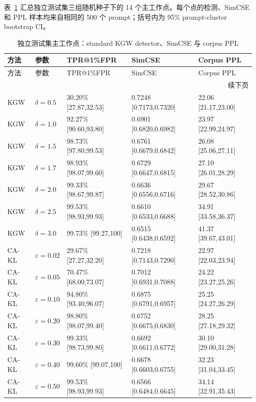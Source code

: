 \documentclass[a4paper,UTF8,zihao=5]{ctexart}
\makeatletter
\newcommand{\cakl}{CA-KL}
\newcommand{\tpr}{TPR@1\%FPR}
\makeatother
\begin{document}
表~\ref{tab:main-test} 汇总独立测试集三组随机种子下的 14 个主工作点。每个点的检测、SimCSE 和 PPL 样本均来自相同的 500 个 prompt；括号内为 95\% prompt-cluster bootstrap CI。

\begin{longtable}{p{}p{}p{}p{}p{}}
    \caption{独立测试集主工作点：standard KGW detector、SimCSE 与 corpus PPL}\label{tab:main-test}                  \\
    \toprule
    方法      & 参数                 & \tpr{}                & SimCSE                 & Corpus PPL          \\
    \midrule
    \endfirsthead
    \toprule
    方法      & 参数                 & \tpr{}                & SimCSE                 & Corpus PPL          \\
    \midrule
    \endhead
    \midrule
    \multicolumn{5}{r}{续下页}                                                                             \\
    \endfoot
    \bottomrule
    \endlastfoot
    KGW     & $\delta=0.5$       & 30.20\% [27.87,32.53] & 0.7248 [0.7173,0.7320] & 22.06 [21.17,23.00] \\
    KGW     & $\delta=1.0$       & 92.27\% [90.60,93.80] & 0.6901 [0.6820,0.6982] & 23.97 [22.99,24.97] \\
    KGW     & $\delta=1.5$       & 98.73\% [97.80,99.53] & 0.6761 [0.6679,0.6842] & 26.08 [25.06,27.11] \\
    KGW     & $\delta=1.7$       & 98.93\% [98.07,99.60] & 0.6729 [0.6647,0.6815] & 27.10 [26.01,28.29] \\
    KGW     & $\delta=2.0$       & 99.33\% [98.67,99.87] & 0.6636 [0.6556,0.6716] & 29.67 [28.52,30.86] \\
    KGW     & $\delta=2.5$       & 99.53\% [98.93,99.93] & 0.6610 [0.6533,0.6688] & 34.91 [33.58,36.37] \\
    KGW     & $\delta=3.0$       & 99.73\% [99.27,100]   & 0.6515 [0.6438,0.6592] & 41.37 [39.67,43.01] \\
    \midrule
    \cakl{} & $\varepsilon=0.02$ & 29.67\% [27.27,32.20] & 0.7218 [0.7143,0.7290] & 22.97 [22.03,23.94] \\
    \cakl{} & $\varepsilon=0.05$ & 70.47\% [68.00,73.07] & 0.7012 [0.6931,0.7088] & 24.22 [23.27,25.26] \\
    \cakl{} & $\varepsilon=0.10$ & 94.80\% [93.40,96.07] & 0.6875 [0.6791,0.6957] & 25.25 [24.27,26.29] \\
    \cakl{} & $\varepsilon=0.20$ & 98.80\% [98.07,99.40] & 0.6752 [0.6675,0.6830] & 28.25 [27.18,29.32] \\
    \cakl{} & $\varepsilon=0.30$ & 99.33\% [98.73,99.80] & 0.6692 [0.6611,0.6772] & 30.10 [29.00,31.28] \\
    \cakl{} & $\varepsilon=0.40$ & 99.60\% [99.07,100]   & 0.6678 [0.6603,0.6755] & 32.23 [31.04,33.45] \\
    \cakl{} & $\varepsilon=0.50$ & 99.53\% [98.93,99.93] & 0.6566 [0.6484,0.6645] & 34.14 [32.91,35.43] \\
\end{longtable}
\end{document}
